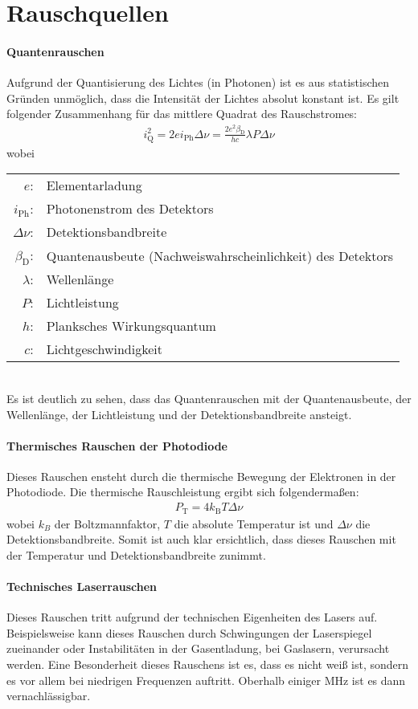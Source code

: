 
\section{Rauschquellen}
\label{sec:rauschen}

\paragraph*{Quantenrauschen}
Aufgrund der Quantisierung des Lichtes (in Photonen) ist es aus statistischen Gründen unmöglich, dass die Intensität der Lichtes absolut konstant ist. Es gilt folgender Zusammenhang für das mittlere Quadrat des Rauschstromes:
\begin{gather}
    i^2_\mathrm{Q} = 2ei_\mathrm{Ph}\Delta \nu = \frac{2e^2\beta_\mathrm{D}}{hc}\lambda P \Delta \nu
\end{gather}
wobei\\
\begin{tabular}{rl}
    $e$: & Elementarladung \\
    $i_\mathrm{Ph}$: & Photonenstrom des Detektors\\
    $\Delta \nu$: & Detektionsbandbreite\\
    $\beta_\mathrm{D}$: & Quantenausbeute (Nachweiswahrscheinlichkeit) des Detektors\\
    $\lambda$: & Wellenlänge\\
    $P$: & Lichtleistung\\
    $h$: & Planksches Wirkungsquantum\\
    $c$: & Lichtgeschwindigkeit
\end{tabular}\\
Es ist deutlich zu sehen, dass das Quantenrauschen mit der Quantenausbeute, der Wellenlänge, der Lichtleistung und der Detektionsbandbreite ansteigt.

\paragraph*{Thermisches Rauschen der Photodiode}
Dieses Rauschen ensteht durch die thermische Bewegung der Elektronen in der Photodiode. Die thermische Rauschleistung ergibt sich folgendermaßen:
\begin{gather}
    P_\mathrm{T} = 4 k_\mathrm{B} T \Delta \nu
\end{gather}
wobei $k_B$ der Boltzmannfaktor, $T$ die absolute Temperatur ist und $\Delta \nu$ die Detektionsbandbreite. Somit ist auch klar ersichtlich, dass dieses Rauschen mit der Temperatur und Detektionsbandbreite zunimmt.


\paragraph*{Technisches Laserrauschen}
Dieses Rauschen tritt aufgrund der technischen Eigenheiten des Lasers auf. Beispielsweise kann dieses Rauschen durch Schwingungen der Laserspiegel zueinander oder Instabilitäten in der Gasentladung, bei Gaslasern, verursacht werden. Eine Besonderheit dieses Rauschens ist es, dass es nicht weiß ist, sondern es vor allem bei niedrigen Frequenzen auftritt. Oberhalb einiger MHz ist es dann vernachlässigbar. 
